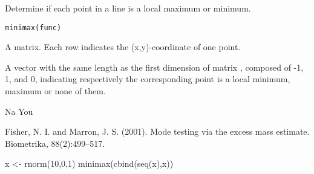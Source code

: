 \begin{Description}\relax
Determine if each point in a line is a local maximum or minimum.
\end{Description}
\begin{Usage}
\begin{verbatim}
minimax(func)
\end{verbatim}
\end{Usage}
\begin{Arguments}
\begin{ldescription}
\item[\code{func}] A matrix. Each row indicates the (x,y)-coordinate of one point.

\end{ldescription}
\end{Arguments}
\begin{Value}
A vector with the same length as the first dimension of matrix
, composed of -1, 1, and 0, indicating respectively
the corresponding point is a local minimum, maximum or none of them.
\end{Value}
\begin{Author}\relax
Na You
\end{Author}
\begin{References}\relax
Fisher, N. I. and Marron, J. S. (2001).
Mode testing via the excess mass estimate. Biometrika, 88(2):499--517.
\end{References}
\begin{Examples}
\begin{ExampleCode}
x <- rnorm(10,0,1)
minimax(cbind(seq(x),x))
\end{ExampleCode}
\end{Examples}

